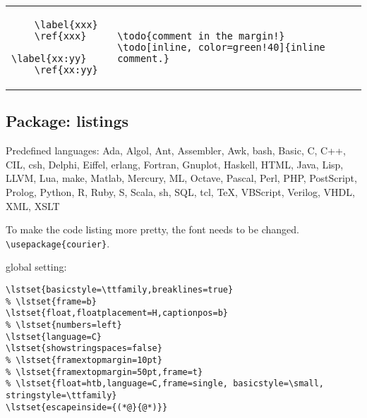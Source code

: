 \begin{tabular}{@{}l|l@{}}
  \begin{lstlisting}
    \label{xxx}
    \ref{xxx}
    \label{xx:yy}
    \ref{xx:yy}
  \end{lstlisting}&
\begin{lstlisting}
\todo{comment in the margin!}
\todo[inline, color=green!40]{inline comment.}
\end{lstlisting}
\end{tabular}


\subsection{Package: listings}
Predefined languages:
Ada, Algol, Ant, Assembler, Awk, bash, Basic, C, C++, CIL, csh,
Delphi, Eiffel, erlang, Fortran, Gnuplot, Haskell, HTML, Java, Lisp,
LLVM, Lua, make, Matlab, Mercury, ML, Octave, Pascal, Perl, PHP,
PostScript, Prolog, Python, R, Ruby, S, Scala, sh, SQL, tcl, TeX,
VBScript, Verilog, VHDL, XML, XSLT


To make the code listing more pretty, the font needs to be changed.
\verb$\usepackage{courier}$.

global setting:

\begin{lstlisting}
\lstset{basicstyle=\ttfamily,breaklines=true}
% \lstset{frame=b}
\lstset{float,floatplacement=H,captionpos=b}
% \lstset{numbers=left}
\lstset{language=C}
\lstset{showstringspaces=false}
% \lstset{framextopmargin=10pt}
% \lstset{framextopmargin=50pt,frame=t}
% \lstset{float=htb,language=C,frame=single, basicstyle=\small, stringstyle=\ttfamily}
\lstset{escapeinside={(*@}{@*)}}
\end{lstlisting}


